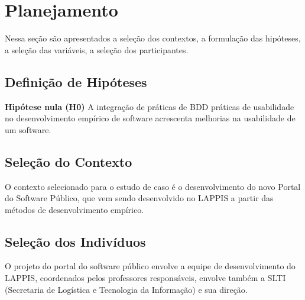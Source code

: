 

\section{Planejamento}

Nessa seção são apresentados a seleção dos contextos, a formulação das hipóteses, a seleção das variáveis, a seleção dos participantes.

\subsection{Definição de Hipóteses}

\textbf{Hipótese nula (H0)} A integração de práticas de BDD práticas de usabilidade no desenvolvimento empírico de software acrescenta melhorias na usabilidade de um software.



\subsection{Seleção do Contexto}

O contexto selecionado para o estudo de caso é o desenvolvimento do novo Portal do Software Público, que vem sendo desenvolvido no LAPPIS a partir das métodos de desenvolvimento empírico.		


\subsection{Seleção dos Indivíduos}

O projeto do portal do software público envolve a equipe de desenvolvimento do LAPPIS, coordenados pelos professores responsáveis, envolve também a SLTI (Secretaria de Logística e Tecnologia da Informação) e sua direção.


